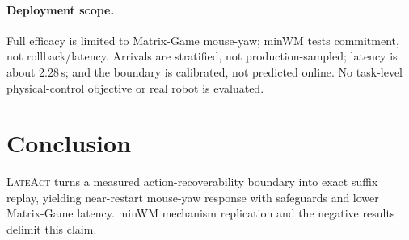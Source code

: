 \documentclass{article}
\newcommand{\method}{\textsc{LateAct}}
\begin{document}
\paragraph{Deployment scope.}
Full efficacy is limited to Matrix-Game mouse-yaw; minWM tests commitment, not
rollback/latency. Arrivals are stratified, not production-sampled; latency is
about 2.28\,s; and the boundary is calibrated, not predicted online. No
task-level physical-control objective or real robot is evaluated.

\section{Conclusion}

\method{} turns a measured action-recoverability boundary into exact suffix
replay, yielding near-restart mouse-yaw response with safeguards and lower
Matrix-Game latency. minWM mechanism replication and the negative results
delimit this claim.

\clearpage



\appendix



\end{document}
